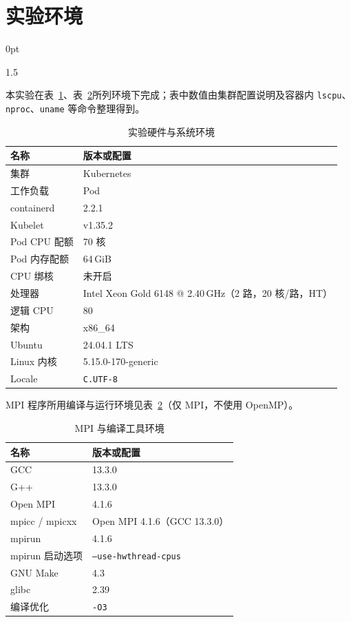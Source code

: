 \documentclass[zihao=-4]{ctexart}
\newcommand{\setParDis}{\setlength {\parskip} {0pt} }
\begin{document}
\setcounter{page}{1} 

\section{实验环境}
\setParDis %
\begin{spacing}{1.5}

本实验在表~\ref{tab:exp-env}、表~\ref{tab:exp-sw}所列环境下完成；表中数值由集群配置说明及容器内 \texttt{lscpu}、\texttt{nproc}、\texttt{uname} 等命令整理得到。

\begin{table}[H]
\small
\centering
\caption{实验硬件与系统环境}
\label{tab:exp-env}
\begin{tabular}{ll}
\toprule
名称 & 版本或配置 \\
\midrule
集群 & Kubernetes \\
工作负载 & Pod \\
containerd & 2.2.1 \\
Kubelet & v1.35.2 \\
\midrule
Pod CPU 配额 & 70 核 \\
Pod 内存配额 & 64\,GiB \\
CPU 绑核 & 未开启 \\
\midrule
处理器 & Intel Xeon Gold 6148 @ 2.40\,GHz（2 路，20 核/路，HT） \\
逻辑 CPU & 80 \\
架构 & x86\_64 \\
\midrule
Ubuntu & 24.04.1 LTS \\
Linux 内核 & 5.15.0-170-generic \\
Locale & \texttt{C.UTF-8} \\
\bottomrule
\end{tabular}
\end{table}

MPI 程序所用编译与运行环境见表~\ref{tab:exp-sw}（仅 MPI，不使用 OpenMP）。

\begin{table}[H]
\small
\centering
\caption{MPI 与编译工具环境}
\label{tab:exp-sw}
\begin{tabular}{ll}
\toprule
名称 & 版本或配置 \\
\midrule
GCC & 13.3.0 \\
G++ & 13.3.0 \\
Open MPI & 4.1.6 \\
mpicc / mpicxx & Open MPI 4.1.6（GCC 13.3.0） \\
mpirun & 4.1.6 \\
mpirun 启动选项 & \texttt{--use-hwthread-cpus} \\
GNU Make & 4.3 \\
glibc & 2.39 \\
编译优化 & \texttt{-O3} \\
\bottomrule
\end{tabular}
\end{table}


\end{spacing}
\end{document}
